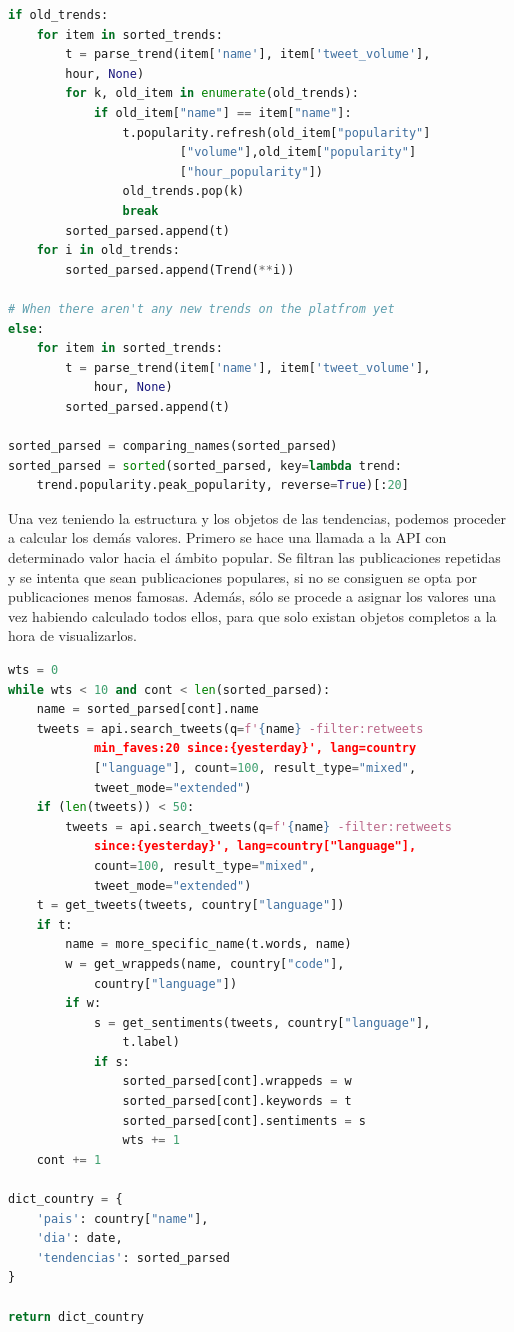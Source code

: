 \begin{lstlisting}[caption=Creación de la estructura de tendencias,          label={lst:listing-python},language=Python]
if old_trends:
    for item in sorted_trends:
        t = parse_trend(item['name'], item['tweet_volume'],
        hour, None)
        for k, old_item in enumerate(old_trends):
            if old_item["name"] == item["name"]:
                t.popularity.refresh(old_item["popularity"]
                        ["volume"],old_item["popularity"]
                        ["hour_popularity"])
                old_trends.pop(k)
                break
        sorted_parsed.append(t)
    for i in old_trends:
        sorted_parsed.append(Trend(**i))

# When there aren't any new trends on the platfrom yet
else:
    for item in sorted_trends:
        t = parse_trend(item['name'], item['tweet_volume'],
            hour, None)
        sorted_parsed.append(t)

sorted_parsed = comparing_names(sorted_parsed)
sorted_parsed = sorted(sorted_parsed, key=lambda trend:
    trend.popularity.peak_popularity, reverse=True)[:20]
\end{lstlisting}

Una vez teniendo la estructura y los objetos de las tendencias, podemos proceder a calcular los demás valores. Primero se hace una llamada a la API con determinado valor hacia el ámbito popular. Se filtran las publicaciones repetidas y se intenta que sean publicaciones populares, si no se consiguen se opta por publicaciones menos famosas. Además, sólo se procede a asignar los valores una vez habiendo calculado todos ellos, para que solo existan objetos completos a la hora de visualizarlos.

\vspace{0.3cm}

\begin{lstlisting}[caption=Creación de la estructura constituyente,          label={lst:listing-python},language=Python]
wts = 0
while wts < 10 and cont < len(sorted_parsed):
    name = sorted_parsed[cont].name
    tweets = api.search_tweets(q=f'{name} -filter:retweets
            min_faves:20 since:{yesterday}', lang=country
            ["language"], count=100, result_type="mixed",
            tweet_mode="extended")
    if (len(tweets)) < 50:
        tweets = api.search_tweets(q=f'{name} -filter:retweets
            since:{yesterday}', lang=country["language"],
            count=100, result_type="mixed",
            tweet_mode="extended")
    t = get_tweets(tweets, country["language"])
    if t:
        name = more_specific_name(t.words, name)
        w = get_wrappeds(name, country["code"],
            country["language"])
        if w:
            s = get_sentiments(tweets, country["language"],
                t.label)
            if s:
                sorted_parsed[cont].wrappeds = w
                sorted_parsed[cont].keywords = t
                sorted_parsed[cont].sentiments = s
                wts += 1
    cont += 1

dict_country = {
    'pais': country["name"],
    'dia': date,
    'tendencias': sorted_parsed
}

return dict_country
\end{lstlisting}

